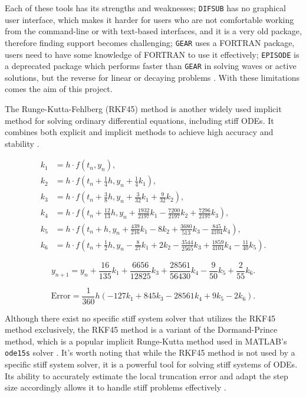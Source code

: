 Each of these tools has its strengths and weaknesses; \texttt{DIFSUB} has no graphical user interface, which makes it harder for users who are not comfortable working from the command-line or with text-based interfaces, and it is a very old package, therefore finding support becomes challenging; \texttt{GEAR} uses a FORTRAN package, users need to have some knowledge of FORTRAN to use it effectively; \texttt{EPISODE} is a deprecated package which performs faster than \texttt{GEAR} in solving waves or active solutions, but the reverse for linear or decaying problems \cite{BYRNE1977125}. With these limitations comes the aim of this project.

The Runge-Kutta-Fehlberg (RKF45) method is another widely used implicit method for solving ordinary differential equations, including stiff ODEs. It combines both explicit and implicit methods to achieve high accuracy and stability \cite{stone2017accelerating}.

\[
\begin{aligned}
  k_1 & = h \cdot f(t_n, y_n), \\
  k_2 & = h \cdot f\left(t_n + \frac{1}{4}h, y_n + \frac{1}{4}k_1\right), \\
  k_3 & = h \cdot f\left(t_n + \frac{3}{8}h, y_n + \frac{3}{32}k_1 + \frac{9}{32}k_2\right), \\
  k_4 & = h \cdot f\left(t_n + \frac{12}{13}h, y_n + \frac{1932}{2197}k_1 - \frac{7200}{2197}k_2 + \frac{7296}{2197}k_3\right), \\
  k_5 & = h \cdot f\left(t_n + h, y_n + \frac{439}{216}k_1 - 8k_2 + \frac{3680}{513}k_3 - \frac{845}{4104}k_4\right), \\
  k_6 & = h \cdot f\left(t_n + \frac{1}{2}h, y_n - \frac{8}{27}k_1 + 2k_2 - \frac{3544}{2565}k_3 + \frac{1859}{4104}k_4 - \frac{11}{40}k_5\right).
\end{aligned}
\]

\[
y_{n+1} = y_n + \frac{16}{135}k_1 + \frac{6656}{12825}k_3 + \frac{28561}{56430}k_4 - \frac{9}{50}k_5 + \frac{2}{55}k_6.
\]

\[
\text{Error} = \frac{1}{360}h(-127k_1 + 845k_3 - 28561k_4 + 9k_5 - 2k_6).
\]

Although there exist no specific stiff system solver that utilizes the RKF45 method exclusively, the RKF45 method is a variant of the Dormand-Prince method, which is a popular implicit Runge-Kutta method used in MATLAB's \texttt{ode15s} solver \cite{BurkardtRKF45}. It's worth noting that while the RKF45 method is not used by a specific stiff system solver, it is a powerful tool for solving stiff systems of ODEs. Its ability to accurately estimate the local truncation error and adapt the step size accordingly allows it to handle stiff problems effectively \cite{BurkardtRKF45}.

